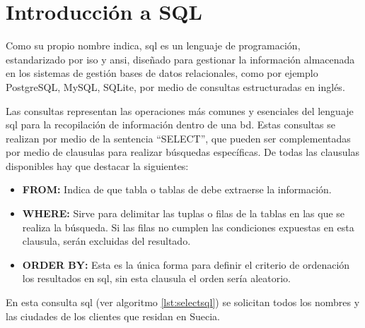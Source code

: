 \section{Introducción a SQL}

Como su propio nombre indica, \acrfull{sql} es un lenguaje de programación, estandarizado por \acrshort{iso}\cite{ISO} y \acrshort{ansi}\cite{ANSI}, diseñado para gestionar la información almacenada en los sistemas de gestión bases de datos relacionales, como por ejemplo PostgreSQL\cite{PostgreSQL}, MySQL\cite{MySQL}, SQLite\cite{SQLite}, por medio de consultas estructuradas en inglés.

Las consultas representan las operaciones más comunes y esenciales del lenguaje \acrshort{sql} para la recopilación de información dentro de una \acrshort{bd}. Estas consultas se realizan por medio de la sentencia ``SELECT'', que pueden ser complementadas por medio de clausulas para realizar búsquedas específicas. De todas las clausulas disponibles hay que destacar la siguientes:

\begin{itemize}
	\item \textbf{FROM:} Indica de que tabla o tablas de debe extraerse la información.
	\item \textbf{WHERE:} Sirve para delimitar las tuplas o filas de la tablas en las que se realiza la búsqueda. Si las filas no cumplen las condiciones expuestas en esta clausula, serán excluidas del resultado.
	\item \textbf{ORDER BY:} Esta es la única forma para definir el criterio de ordenación los resultados en \acrshort{sql}, sin esta clausula el orden sería aleatorio.
\end{itemize}

\clearpage



En esta consulta \acrshort{sql} (ver algoritmo \ref{lst:selectsql}) se solicitan todos los nombres y las ciudades de los clientes que residan en Suecia.